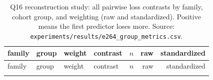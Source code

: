 \begin{longtable}{llllrrr}
\caption{Q16 reconstruction study: all pairwise loss contrasts by family, cohort group, and
weighting (raw and standardized). Positive means the first predictor loses more. Source:
\texttt{experiments/results/e264\_group\_metrics.csv}.}
\label{tab:reconcontrasts}\\
\toprule
family & group & weight & contrast & $n$ & raw & standardized \\
\midrule
\endfirsthead
\toprule
family & group & weight & contrast & $n$ & raw & standardized \\
\midrule
\endhead
\bottomrule
\endfoot
\end{longtable}

